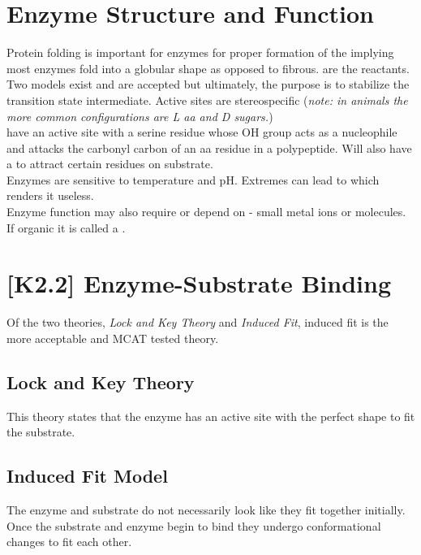 \documentclass[../Bio_chemistryReview.tex]{subfiles}
\begin{document}
\section{Enzyme Structure and Function}

Protein folding is important for enzymes for proper formation of the
 implying most enzymes fold into a globular shape as opposed
to fibrous.  are the reactants. Two models exist and are
accepted but ultimately, the purpose is to stabilize the transition state
intermediate.  Active sites are stereospecific (\emph{note: in animals the more
common configurations are L aa and D sugars.})\\
 have an active site with a serine residue whose OH group acts
as a nucleophile and attacks the carbonyl carbon of an aa residue in a
polypeptide. Will also have a  to attract certain
residues on substrate.\\
Enzymes are sensitive to temperature and pH. Extremes can lead to
 which renders it useless.\\
Enzyme function may also require or depend on  - small metal
ions or molecules. If organic it is called a .

\section{[K2.2] Enzyme-Substrate Binding\supdag}

Of the two theories, \emph{Lock and Key Theory} and \emph{Induced Fit}, induced
fit is the more acceptable and MCAT tested theory.

\subsection{Lock and Key Theory\supdag}

This theory states that the enzyme has an active site with the perfect shape to
fit the substrate.

\subsection{Induced Fit Model\supdag}

The enzyme and substrate do not necessarily look like they fit together
initially. Once the substrate and enzyme begin to bind they undergo
conformational changes to fit each other.
\end{document}
